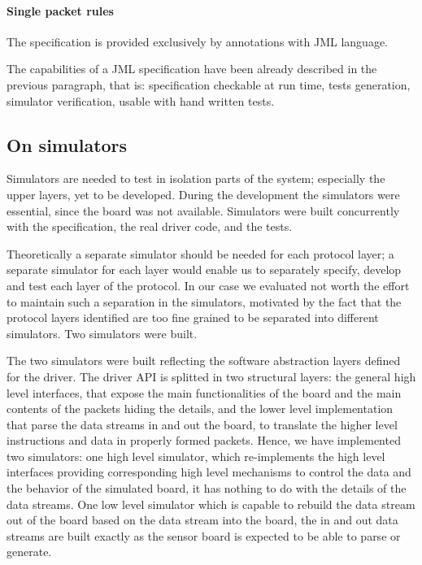 \documentclass{article} \usepackage{times}
\begin{document}
\paragraph{Single packet rules}

The specification is provided exclusively by annotations with JML language. 

The capabilities of a JML specification have been already described in the previous 
paragraph, that is: specification checkable at run time, tests generation, simulator 
verification, usable with hand written tests.

\subsection{On simulators}
\label{subsec:on_simulators}

Simulators are needed to test in isolation parts of the system; especially the upper 
layers, yet to be developed. 
During the development the simulators were essential, since the board was not available.
Simulators were built concurrently with the specification, the real driver code, and the 
tests.

Theoretically a separate simulator should be needed for each protocol layer; a
separate simulator for each layer would enable us to separately specify, develop and test
each layer of the protocol.
In our case we evaluated not worth the effort to maintain such a separation in the 
simulators, motivated by the fact that the protocol layers identified are too fine grained 
to be separated into different simulators. 
Two simulators were built.

The two simulators were built reflecting the software abstraction layers defined for the 
driver.
The driver API is splitted in two structural layers: the general high level interfaces, that 
expose the main functionalities of the board and the main contents of the packets hiding the 
details, and the lower level implementation that parse the data streams in and out the board, 
to translate the higher level instructions and data in properly formed packets.
Hence, we have implemented two simulators: one high level simulator, which re-implements the 
high level interfaces providing corresponding high level mechanisms to control the data and 
the behavior of the simulated board, it has nothing to do with the details of the data 
streams.
One low level simulator which is capable to rebuild the data stream out of the board based on 
the data stream into the board, the in and out data streams are built exactly as the sensor 
board is expected to be able to parse or generate.
\end{document}
